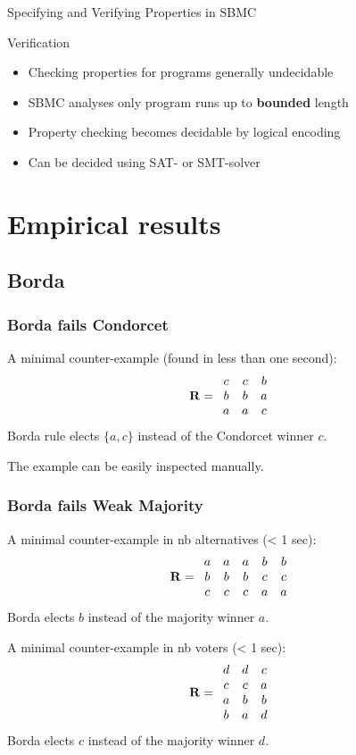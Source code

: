 \documentclass[french,english]{beamer}
\begin{document}
\begin{frame}{Specifying and Verifying Properties in SBMC\hspace*{-1.8em}}
\begin{block}{Verification}
\begin{itemize}
\item Checking properties for programs generally undecidable
\item SBMC analyses only program runs up to \textbf{bounded} length
\item Property checking becomes decidable by logical encoding
\item Can be decided using SAT- or SMT-solver
\end{itemize}
\end{block}
\end{frame}

\section{Empirical results}
\subsection{Borda}
\begin{frame}
	\frametitle{Borda fails Condorcet}
	A minimal counter-example (found in less than one second):
	\begin{equation}
		\mathbf{R} =
		\begin{array}{ccc}
			c	&	c	&	b\\
			b	&	b	&	a\\
			a	&	a	&	c
		\end{array}
	\end{equation}
	Borda rule elects $\{a,c\}$ instead of the Condorcet winner $c$.
	
	The example can be easily inspected manually.
\end{frame}

\begin{frame}
	\frametitle{Borda fails Weak Majority}
	A minimal counter-example in nb alternatives (< 1 sec):
	\begin{equation}
		\mathbf{R} =
		\begin{array}{ccccc}
			a	&	a	&	a	&	b	&	b\\
			b	&	b	&	b	&	c	&	c\\
			c	&	c	&	c	&	a	&	a
		\end{array}
	\end{equation}
	Borda elects $b$ instead of the majority winner $a$.

	A minimal counter-example in nb voters (< 1 sec):
	\begin{equation}
		\mathbf{R} =
		\begin{array}{ccc}
			d	&	d	&	c\\
			c	&	c	&	a\\
			a	&	b	&	b\\
			b	&	a	&	d
		\end{array}
	\end{equation}
	Borda elects $c$ instead of the majority winner $d$.
\end{frame}
\end{document}
